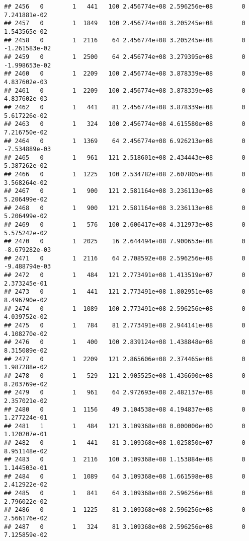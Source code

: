 \documentclass[
]{article}
\begin{document}
\begin{enumerate}
\begin{verbatim}
## 2456   0        1   441   100 2.456774e+08 2.596256e+08        0  7.241881e-02
## 2457   0        1  1849   100 2.456774e+08 3.205245e+08        0  1.543565e-02
## 2458   0        1  2116    64 2.456774e+08 3.205245e+08        0 -1.261583e-02
## 2459   0        1  2500    64 2.456774e+08 3.279395e+08        0 -1.998653e-02
## 2460   0        1  2209   100 2.456774e+08 3.878339e+08        0  4.837602e-03
## 2461   0        1  2209   100 2.456774e+08 3.878339e+08        0  4.837602e-03
## 2462   0        1   441    81 2.456774e+08 3.878339e+08        0  5.617226e-02
## 2463   0        1   324   100 2.456774e+08 4.615580e+08        0  7.216750e-02
## 2464   0        1  1369    64 2.456774e+08 6.926213e+08        0 -7.534889e-03
## 2465   0        1   961   121 2.518601e+08 2.434443e+08        0  5.387262e-02
## 2466   0        1  1225   100 2.534782e+08 2.607805e+08        0  3.568264e-02
## 2467   0        1   900   121 2.581164e+08 3.236113e+08        0  5.206499e-02
## 2468   0        1   900   121 2.581164e+08 3.236113e+08        0  5.206499e-02
## 2469   0        1   576   100 2.606417e+08 4.312973e+08        0  5.575242e-02
## 2470   0        1  2025    16 2.644494e+08 7.900653e+08        0 -8.679282e-03
## 2471   0        1  2116    64 2.708592e+08 2.596256e+08        0 -9.488794e-03
## 2472   0        1   484   121 2.773491e+08 1.413519e+07        0  2.373245e-01
## 2473   0        1   441   121 2.773491e+08 1.802951e+08        0  8.496790e-02
## 2474   0        1  1089   100 2.773491e+08 2.596256e+08        0  4.039752e-02
## 2475   0        1   784    81 2.773491e+08 2.944141e+08        0  4.108270e-02
## 2476   0        1   400   100 2.839124e+08 1.438848e+08        0  8.315089e-02
## 2477   0        1  2209   121 2.865606e+08 2.374465e+08        0  1.987288e-02
## 2478   0        1   529   121 2.905525e+08 1.436690e+08        0  8.203769e-02
## 2479   0        1   961    64 2.972693e+08 2.482137e+08        0  2.357021e-02
## 2480   0        1  1156    49 3.104538e+08 4.194837e+08        0  1.277224e-01
## 2481   1        1   484   121 3.109368e+08 0.000000e+00        0  1.120207e-01
## 2482   0        1   441    81 3.109368e+08 1.025850e+07        0  8.951148e-02
## 2483   0        1  2116   100 3.109368e+08 1.153884e+08        0  1.144503e-01
## 2484   0        1  1089    64 3.109368e+08 1.661598e+08        0  2.412922e-02
## 2485   0        1   841    64 3.109368e+08 2.596256e+08        0  2.796022e-02
## 2486   0        1  1225    81 3.109368e+08 2.596256e+08        0  2.566176e-02
## 2487   0        1   324    81 3.109368e+08 2.596256e+08        0  7.125859e-02

\end{verbatim}
\end{enumerate}
\end{document}
